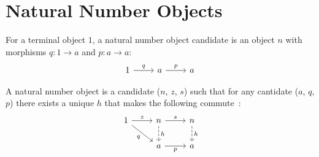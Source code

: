 \section{Natural Number Objects}
\begin{definition}
	For a terminal object $1$, a natural number object candidate is an object $n$
	with morphisms $q: 1 \to a$ and $p: a \to a$:
	\[\begin{tikzcd}[ampersand replacement=\&]
		1 \& a \& a
		\arrow["q", from=1-1, to=1-2]
		\arrow["p", from=1-2, to=1-3]
	\end{tikzcd}\]

	A natural number object is a candidate ($n$, $z$, $s$) such that for any
	cantidate ($a$, $q$, $p$) there exists a unique $h$ that makes the following
	commute~\parencite[p.~246]{awodey:category_theory}:
	\[\begin{tikzcd}[ampersand replacement=\&]
		1 \& n \& n \\
		\& a \& a
		\arrow["z", from=1-1, to=1-2]
		\arrow["q"', from=1-1, to=2-2]
		\arrow["s", from=1-2, to=1-3]
		\arrow["p"', from=2-2, to=2-3]
		\arrow["h", dashed, from=1-2, to=2-2]
		\arrow["h", dashed, from=1-3, to=2-3]
	\end{tikzcd}\]
\end{definition}
